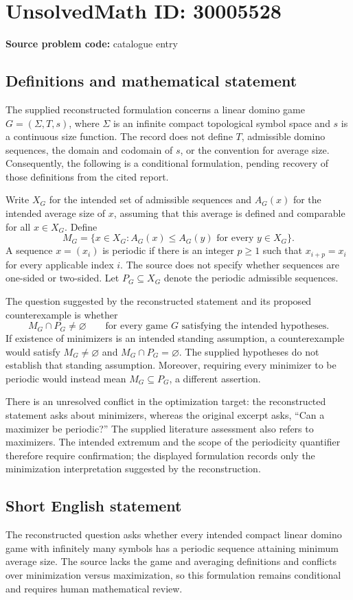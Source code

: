 \documentclass[11pt]{article}
\begin{document}
\section*{UnsolvedMath ID: 30005528}
\textbf{Source problem code:} catalogue entry
\subsection{Definitions and mathematical statement}
The supplied reconstructed formulation concerns a linear domino game \(G=(\Sigma,T,s)\), where \(\Sigma\) is an infinite compact topological symbol space and \(s\) is a continuous size function. The record does not define \(T\), admissible domino sequences, the domain and codomain of \(s\), or the convention for average size. Consequently, the following is a conditional formulation, pending recovery of those definitions from the cited report.

Write \(X_G\) for the intended set of admissible sequences and \(A_G(x)\) for the intended average size of \(x\), assuming that this average is defined and comparable for all \(x\in X_G\). Define
\[
M_G=\{x\in X_G: A_G(x)\leq A_G(y)\text{ for every }y\in X_G\}.
\]
A sequence \(x=(x_i)\) is periodic if there is an integer \(p\geq1\) such that \(x_{i+p}=x_i\) for every applicable index \(i\). The source does not specify whether sequences are one-sided or two-sided. Let \(P_G\subseteq X_G\) denote the periodic admissible sequences.

The question suggested by the reconstructed statement and its proposed counterexample is whether
\[
M_G\cap P_G\neq\varnothing
\qquad\text{for every game }G\text{ satisfying the intended hypotheses}.
\]
If existence of minimizers is an intended standing assumption, a counterexample would satisfy \(M_G\neq\varnothing\) and \(M_G\cap P_G=\varnothing\). The supplied hypotheses do not establish that standing assumption. Moreover, requiring every minimizer to be periodic would instead mean \(M_G\subseteq P_G\), a different assertion.

There is an unresolved conflict in the optimization target: the reconstructed statement asks about minimizers, whereas the original excerpt asks, ``Can a maximizer be periodic?'' The supplied literature assessment also refers to maximizers. The intended extremum and the scope of the periodicity quantifier therefore require confirmation; the displayed formulation records only the minimization interpretation suggested by the reconstruction.
\subsection{Short English statement}
The reconstructed question asks whether every intended compact linear domino game with infinitely many symbols has a periodic sequence attaining minimum average size. The source lacks the game and averaging definitions and conflicts over minimization versus maximization, so this formulation remains conditional and requires human mathematical review.
\end{document}
